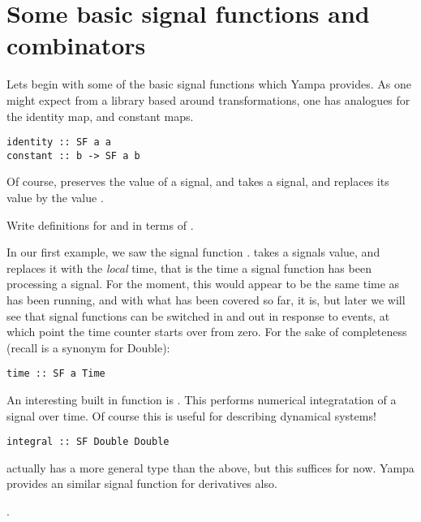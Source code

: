 \section{Some basic signal functions and combinators}

Lets begin with some of the basic signal functions which Yampa provides. As one might expect from a library based around transformations, one has analogues for the identity map, and constant maps.

\begin{lstlisting}
identity :: SF a a
constant :: b -> SF a b
\end{lstlisting}

\noindent Of course,  preserves the value of a signal, and  takes a signal, and replaces its value by the value .

\begin{exercise}
Write definitions for  and  in terms of .
\end{exercise}

In our first example, we saw the signal function .  takes a signals value, and replaces it with the \emph{local} time, that is the time a signal function has been processing a signal. For the moment, this would appear to be the same time as \yampaMain has been running, and with what has been covered so far, it is, but later we will see that signal functions can be switched in and out in response to events, at which point the time counter starts over from zero. For the sake of completeness (recall  is a synonym for Double):

\begin{lstlisting}
time :: SF a Time
\end{lstlisting}

An interesting built in function is . This performs numerical integratation of a signal over time. Of course this is useful for describing dynamical systems!

\begin{lstlisting}
integral :: SF Double Double
\end{lstlisting}

 actually has a more general type than the above, but this suffices for now. Yampa provides an similar signal function for derivatives also.

\begin{observation}
.
\end{observation}

